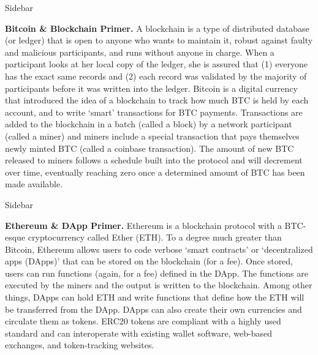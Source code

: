 
\begin{Sidebar*}[h!]
\begin{framed}
Sidebar
\begin{flushleft}
\textbf{Bitcoin \& Blockchain Primer.} A blockchain is a type of distributed database (or ledger) that is open to anyone who wants to maintain it, robust against faulty and malicious participants, and runs without anyone in charge. When a participant looks at her local copy of the ledger, she is assured that (1) everyone has the exact same records and (2) each record was validated by the majority of participants before it was written into the ledger. Bitcoin is a digital currency that introduced the idea of a blockchain to track how much BTC is held by each account, and to write `smart' transactions for BTC payments. Transactions are added to the blockchain in a batch (called a block) by a network participant (called a miner) and miners include a special transaction that pays themselves newly minted BTC (called a coinbase transaction). The amount of new BTC released to miners follows a schedule built into the protocol and will decrement over time, eventually reaching zero once a determined amount of BTC has been made available. 
\end{flushleft}
\end{framed}
\end{Sidebar*}


\begin{Sidebar*}[h!]
\begin{framed}
Sidebar
\begin{flushleft}
\textbf{Ethereum \& DApp Primer.} Ethereum is a blockchain protocol with a BTC-esque cryptocurrency called Ether (ETH). To a degree much greater than Bitcoin, Ethereum allows users to code verbose `smart contracts' or `decentralized apps (DApps)' that can be stored on the blockchain (for a fee). Once stored, users can run functions (again, for a fee) defined in the DApp. The functions are executed by the miners and the output is written to the blockchain. Among other things, DApps can hold ETH and write functions that define how the ETH will be transferred from the DApp. DApps can also create their own currencies and circulate them as tokens. ERC20 tokens are compliant with a highly used standard and can interoperate with existing wallet software, web-based exchanges, and token-tracking websites.
\end{flushleft}
\end{framed}
\end{Sidebar*}

